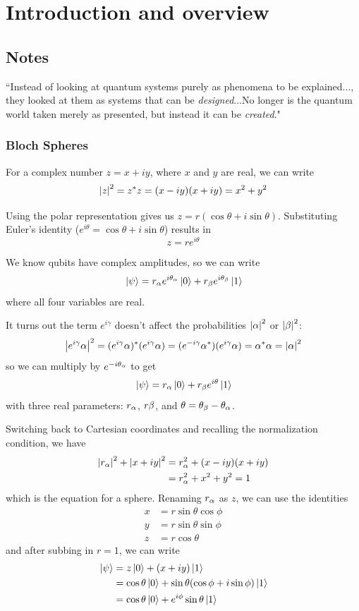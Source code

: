 \chapter{Introduction and overview}

\section{Notes}

``Instead of looking at quantum systems purely as phenomena to be explained..., they looked at them as systems that can be \textit{designed}...No longer is the quantum world taken merely as presented, but instead it can be \textit{created}." 

\subsection{Bloch Spheres}

For a complex number $z = x + iy$, where $x$ and $y$ are real, we can write 
$$\abs{z}^{2} = z^{*} z = (x - iy)(x + iy) = x^{2} + y^{2}$$

Using the polar representation gives us $z = r(\cos \theta + i \sin \theta)$. Substituting Euler's identity ($e^{i \theta} = \cos \theta + i \sin \theta$) results in 
$$ z = re^{i \theta}$$

We know qubits have complex amplitudes, so we can write
$$\ket*{\psi} = r_{\alpha} e^{i \theta_{\alpha}} \ket*{0} + r_{\beta} e^{i \theta_{\beta}} \ket*{1}$$
where all four variables are real. 

It turns out the term $e^{i \gamma}$ doesn't affect the probabilities $\abs{\alpha}^{2}$ or $\abs{\beta}^{2}$:
$$ \abs{e^{i \gamma} \alpha}^{2} = (e^{i \gamma} \alpha)^{*} (e^{i \gamma} \alpha) = (e^{-i \gamma} \alpha^{*})(e^{i \gamma} \alpha) = \alpha^{*} \alpha = \abs{\alpha}^{2}$$
so we can multiply by $e^{-i \theta_{\alpha}}$ to get 
$$\ket*{\psi} = r_{\alpha} \ket*{0} + r_{\beta} e^{i \theta} \ket*{1}$$
with three real parameters: $r_{\alpha}$, $r{\beta}$, and $\theta = \theta_{\beta} - \theta_{\alpha}$. 

Switching back to Cartesian coordinates and recalling the normalization condition, we have 
$$
\begin{aligned}
\abs{r_{\alpha}}^{2} + \abs{x + iy}^{2} &= r_{\alpha}^{2} + (x - iy)(x + iy) \\
&= r_{\alpha}^{2} + x^{2} + y^{2} = 1
\end{aligned}
$$
which is the equation for a sphere. Renaming $r_{\alpha}$ as $z$, we can use the identities
$$
\begin{aligned}
x &= r \sin \theta \cos \phi \\
y &= r \sin \theta \sin \phi \\
z &= r \cos \theta
\end{aligned}
$$
and after subbing in $r = 1$, we can write 
$$
\begin{aligned}
\ket*{\psi} &= z \ket*{0} + (x + iy) \ket*{1} \\
&= \cos \theta \ket*{0} + \sin \theta (\cos \phi + i \sin \phi) \ket*{1} \\
&= \cos \theta \ket*{0} + e^{i \phi} \sin \theta \ket*{1}
\end{aligned}
$$

